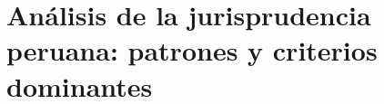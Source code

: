 %
%
%

\section{Análisis de la jurisprudencia peruana: patrones y criterios dominantes}
\label{sec:jurisprudencia}

